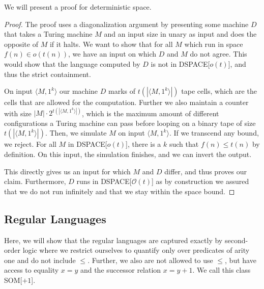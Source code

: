 We will present a proof for deterministic space.
\begin{proof}
    The proof uses a diagonalization argument by presenting some machine $D$ that takes a Turing machine $M$ and an input size in unary as input and does the opposite of $M$ if it halts.
    We want to show that for all $M$ which run in space $f(n) \in o(t(n))$, we have an input on which $D$ and $M$ do not agree.
    This would show that the language computed by $D$ is not in DSPACE[$o(t)$], and thus the strict containment.

    On input $\langle M, 1^{k} \rangle$ our machine $D$ marks of $t(|\langle M, 1^{k} \rangle|)$ tape cells, which are the cells that are allowed for the computation.
    Further we also maintain a counter with size $|M|\cdot 2^{t(|\langle M, 1^{k} \rangle|)}$, which is the maximum amount of different configurations a Turing machine can pass before looping on a binary tape of size $t(|\langle M, 1^{k} \rangle|)$.
    Then, we simulate $M$ on input $\langle M, 1^{k} \rangle$.
    If we transcend any bound, we reject.
    For all $M$ in DSPACE[$o(t)$], there is a $k$ such that $f(n) \leq t(n)$ by definition.
    On this input, the simulation finishes, and we can invert the output.

    This directly gives us an input for which $M$ and $D$ differ, and thus proves our claim.
    Furthermore, $D$ runs in DSPACE[$\mathcal{O}(t)$] as by construction we assured that we do not run infinitely and that we stay within the space bound.
\end{proof}



\subsection{Regular Languages}\label{subsec:des-regular-languages}

Here, we will show that the regular languages are captured exactly by second-order logic where we restrict ourselves to quantify only over predicates of arity one and do not include $\leq$.
Further, we also are not allowed to use $\leq$, but have access to equality $x = y$ and the successor relation $x = y + 1$.
We call this class SOM[$+1$].

